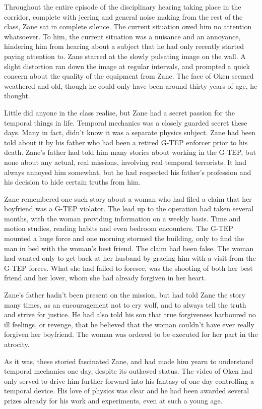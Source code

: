Throughout the entire episode of the disciplinary hearing taking place in the corridor, complete with jeering and general noise making from the rest of the class, Zane sat in complete silence.  The current situation owed him no attention whatsoever.  To him, the current situation was a nuisance and an annoyance, hindering him from hearing about a subject that he had only recently started paying attention to.  Zane starred at the slowly pulsating image on the wall.  A slight distortion ran down the image at regular intervals, and prompted a quick concern about the quality of the equipment from Zane.  The face of Oken seemed weathered and old, though he could only have been around thirty years of age, he thought.  

Little did anyone in the class realise, but Zane had a secret passion for the temporal things in life.  Temporal mechanics was a closely guarded secret these days.  Many in fact, didn't know it was a separate physics subject.  Zane had been told about it by his father who had been a retired G-TEP enforcer prior to his death.  Zane's father had told him many stories about working in the G-TEP, but none about any actual, real missions, involving real temporal terrorists.  It had always annoyed him somewhat, but he had respected his father's profession and his decision to hide certain truths from him.

Zane remembered one such story about a woman who had filed a claim that her boyfriend was a G-TEP violator.  The lead up to the operation had taken several months, with the woman providing information on a weekly basis.  Time and motion studies, reading habits and even bedroom encounters.  The G-TEP mounted a huge force and one morning stormed the building, only to find the man in bed with the woman's best friend.  The claim had been false.  The woman had wanted only to get back at her husband by gracing him with a visit from the G-TEP forces.  What she had failed to foresee, was the shooting of both her best friend and her lover, whom she had already forgiven in her heart.

Zane's father hadn't been present on the mission, but had told Zane the story many times, as an encouragement not to cry wolf, and to always tell the truth and strive for justice.  He had also told his son that true forgiveness harboured no ill feelings, or revenge, that he believed that the woman couldn't have ever really forgiven her boyfriend.  The woman was ordered to be executed for her part in the atrocity.  

As it was, these storied fascinated Zane, and had made him yearn to understand temporal mechanics one day, despite its outlawed status.  The video of Oken had only served to drive him further forward into his fantasy of one day controlling a temporal device.  His love of physics was clear and he had been awarded several prizes already for his work and experiments, even at such a young age.  

